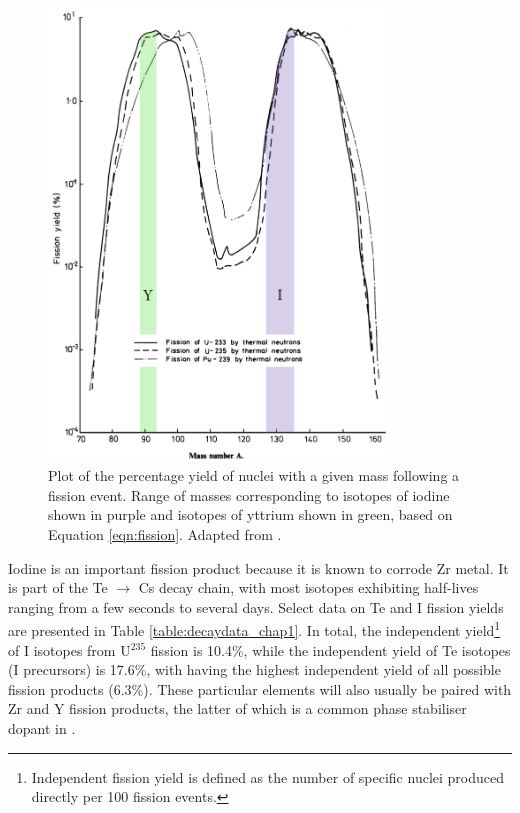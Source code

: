 \begin{figure}[ht!]
\centering
\includegraphics[height=12cm]{images/fissionyield.jpg}
\caption[Plot of the percentage yield of nuclei with a given mass following a fission event. Range of masses corresponding to isotopes of iodine shown in purple and isotopes of yttrium shown in green, based on Equation \ref{eqn:fission}.]{Plot of the percentage yield of nuclei with a given mass following a fission event. Range of masses corresponding to isotopes of iodine shown in purple and isotopes of yttrium shown in green, based on Equation \ref{eqn:fission}. Adapted from \cite{England1992}.}
\label{figure:fissionyield}
\end{figure}

Iodine is an important fission product because it is known to corrode Zr metal. It is part of the Te $\rightarrow$ Cs decay chain, with most isotopes exhibiting half-lives ranging from a few seconds to several days. Select data on Te and I fission yields are presented in Table \ref{table:decaydata_chap1}. In total, the independent yield\footnote{Independent fission yield is defined as the number of specific nuclei produced directly per 100 fission events.} of I isotopes from U$^{235}$ fission is 10.4\%, while the independent yield of Te isotopes (I precursors) is 17.6\%, with  having the highest independent yield of all possible fission products (6.3\%). These particular elements will also usually be paired with Zr and Y fission products, the latter of which is a common phase stabiliser dopant in \zirconia .

